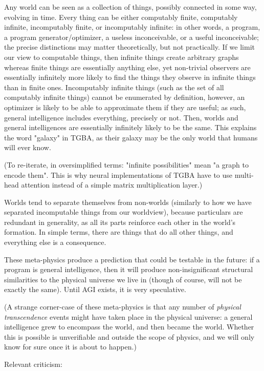 \documentclass{article}
\begin{document}
Any world can be seen as a collection of things, possibly connected in some way, evolving in time. Every thing can be either computably finite, computably infinite, incomputably finite, or incomputably infinite: in other words, a program, a program generator/optimizer, a useless inconceivable, or a useful inconceivable; the precise distinctions may matter theoretically, but not practically. If we limit our view to computable things, then infinite things create arbitrary graphs whereas finite things are essentially anything else, yet non-trivial observers are essentially infinitely more likely to find the things they observe in infinite things than in finite ones. Incomputably infinite things (such as the set of all computably infinite things) cannot be enumerated by definition, however, an optimizer is likely to be able to approximate them if they are useful; as such, general intelligence includes everything, precisely or not. Then, worlds and general intelligences are essentially infinitely likely to be the same. This explains the word "galaxy" in TGBA, as their galaxy may be the only world that humans will ever know.

(To re-iterate, in oversimplified terms: "infinite possibilities" mean "a graph to encode them". This is why neural implementations of TGBA have to use multi-head attention instead of a simple matrix multiplication layer.)

Worlds tend to separate themselves from non-worlds (similarly to how we have separated incomputable things from our worldview), because particulars are redundant in generality, as all its parts reinforce each other in the world's formation. In simple terms, there are things that do all other things, and everything else is a consequence.

These meta-physics produce a prediction that could be testable in the future: if a program is general intelligence, then it will produce non-insignificant structural similarities to the physical universe we live in (though of course, will not be exactly the same). Until AGI exists, it is very speculative.

(A strange corner-case of these meta-physics is that any number of \textit{physical transcendence} events might have taken place in the physical universe: a general intelligence grew to encompass the world, and then became the world. Whether this is possible is unverifiable and outside the scope of physics, and we will only know for sure once it is about to happen.)

Relevant criticism:
\end{document}
